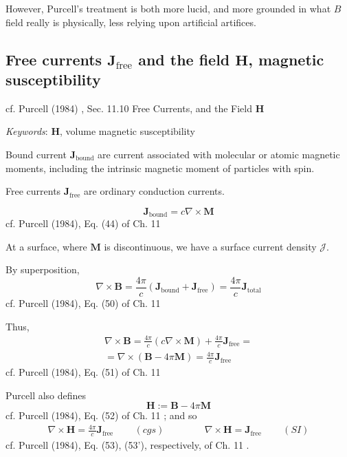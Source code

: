 \documentclass[10pt]{amsart}
\begin{document}
\begin{multicols*}{2}
However, Purcell's treatment is both more lucid, and more grounded in what $B$ field really is physically, less relying upon artificial artifices.  

\subsection{Free currents $\mathbf{J}_{\text{free}}$ and the field $\mathbf{H}$, magnetic susceptibility}

cf. Purcell (1984) \cite{Purc1984}, Sec. 11.10 Free Currents, and the Field $\mathbf{H}$  

\emph{Keywords}: $\mathbf{H}$, volume magnetic susceptibility

Bound current $\mathbf{J}_{\text{bound}}$ are current associated with molecular or atomic magnetic moments, including the intrinsic magnetic moment of particles with spin.  

Free currents $\mathbf{J}_{\text{free}}$ are ordinary conduction currents.  

\begin{equation}
\mathbf{J}_{\text{bound}} = c \nabla \times \mathbf{M}
\end{equation}
cf. Purcell (1984), Eq. (44) of Ch. 11 \cite{Purc1984}

At a surface, where $\mathbf{M}$ is discontinuous, we have a surface current density $\mathcal{J}$.  


By superposition, 
\begin{equation}
	\nabla \times \mathbf{B} = \frac{ 4\pi }{c} (\mathbf{J}_{\text{bound}} + \mathbf{J}_{\text{free} } ) = \frac{4\pi }{ c} \mathbf{J}_{\text{total} }
\end{equation}
cf. Purcell (1984), Eq. (50) of Ch. 11 \cite{Purc1984}

Thus, 
\[
\begin{gathered}
\nabla \times \mathbf{B} = \frac{ 4\pi}{c}(c\nabla \times \mathbf{M} ) + \frac{4\pi}{c} \mathbf{J}_{\text{free}} = \\
	= \nabla \times (\mathbf{B} - 4\pi \mathbf{M} ) = \frac{4\pi }{c} \mathbf{J}_{\text{free} }
\end{gathered}
\]
cf. Purcell (1984), Eq. (51) of Ch. 11 \cite{Purc1984}

Purcell also defines 
\begin{equation}
\mathbf{H} := \mathbf{B}-4\pi \mathbf{M}
\end{equation}
cf. Purcell (1984), Eq. (52) of Ch. 11 \cite{Purc1984}; and so 
\[
\begin{gathered}
\nabla \times \mathbf{H} = \frac{4\pi}{c} \mathbf{J}_{\text{free}} \qquad \, (cgs) \qquad \qquad \, \nabla \times \mathbf{H} = \mathbf{J}_{\text{free}} \qquad \, (SI)
\end{gathered}
\]
cf. Purcell (1984), Eq. (53), (53'), respectively, of Ch. 11 \cite{Purc1984}.  


\end{multicols*}
\end{document}
